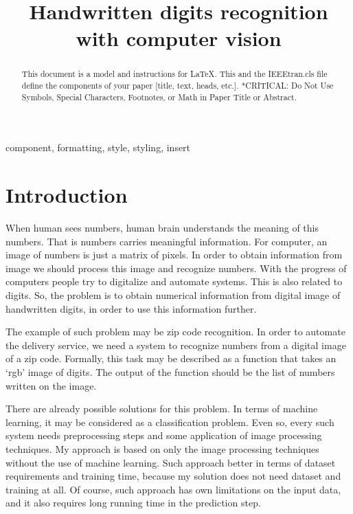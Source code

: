 \documentclass[conference]{IEEEtran}
\begin{document}
\title{Handwritten digits recognition with computer vision}

\author{
}

\maketitle

\begin{abstract}
This document is a model and instructions for \LaTeX.
This and the IEEEtran.cls file define the components of your paper [title, text, heads, etc.]. *CRITICAL: Do Not Use Symbols, Special Characters, Footnotes, 
or Math in Paper Title or Abstract.
\end{abstract}

\begin{IEEEkeywords}
component, formatting, style, styling, insert
\end{IEEEkeywords}

\section{Introduction} 

When human sees numbers, human brain understands the meaning of this numbers. That is numbers carries meaningful information. For computer, an image of numbers is just a matrix of pixels. In order to obtain information from image we should process this image and recognize numbers. With the progress of computers people try to digitalize and automate systems. This is also related to digits. So, the problem is to obtain numerical information from digital image of handwritten digits, in order to use this information further. 

The example of such problem may be zip code recognition. In order to automate the delivery service, we need a system to recognize numbers from a digital image of a zip code. Formally, this task may be described as a function that takes an ‘rgb’ image of digits. The output of the function should be the list of numbers written on the image.  

There are already possible solutions for this problem. In terms of machine learning, it may be considered as a classification problem. Even so, every such system needs preprocessing steps and some application of image processing techniques. My approach is based on only the image processing techniques without the use of machine learning. Such approach better in terms of dataset requirements and training time, because my solution does not need dataset and training at all. Of course, such approach has own limitations on the input data, and it also requires long running time in the prediction step.  
\end{document}
